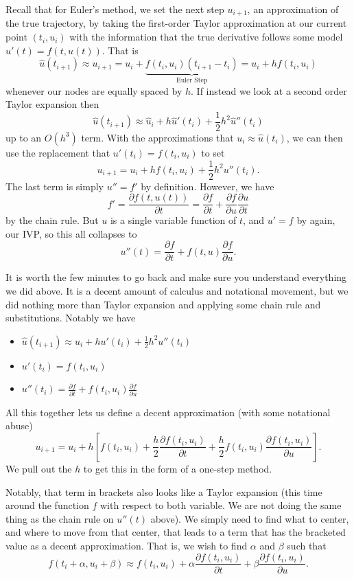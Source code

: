 \documentclass[11pt]{article}
\begin{document}
Recall that for Euler's method, we set the next step $u_{i+1}$, an approximation of the true trajectory, by taking the first-order Taylor approximation at our current point $(t_i, u_i)$ with the information that the true derivative follows some model $u'(t) = f(t, u(t))$. That is $$\hat{u}(t_{i+1}) \approx u_{i+1} = u_i + \underbrace{f(t_i, u_i)(t_{i+1}-t_i)}_{\text{Euler Step}} = u_i + hf(t_i, u_i)$$ whenever our nodes are equally spaced by $h$. If instead we look at a second order Taylor expansion then $$\hat{u}(t_{i+1}) \approx \hat{u}_i + h\hat{u}'(t_i) + \frac{1}{2}h^2 \hat{u}''(t_i)$$ up to an $O(h^3)$ term. With the approximations that $u_i \approx \hat{u}(t_i)$, we can then use the replacement that $u'(t_i)=f(t_i, u_i)$ to set $$u_{i+1} = u_i + hf(t_i, u_i) + \frac{1}{2}h^2 u''(t_i).$$
The last term is simply $u'' = f'$ by definition. However, we have $$f' = \frac{\partial f(t, u(t))}{\partial t} = \frac{\partial f}{\partial t}  + \frac{\partial f}{\partial u} \frac{\partial u}{\partial t} $$
by the chain rule. But $u$ is a single variable function of $t$, and $u' = f$ by again, our IVP, so this all collapses to $$u''(t) = \frac{\partial f}{\partial t}  + f(t,u)\frac{\partial f}{\partial u} .$$
\begin{remark}
    It is worth the few minutes to go back and make sure you understand everything we did above. It is a decent amount of calculus and notational movement, but we did nothing more than Taylor expansion and applying some chain rule and substitutions. Notably we have \begin{itemize}
        \item $\hat{u}(t_{i+1}) \approx u_i + hu'(t_i) + \frac{1}{2}h^2 u''(t_i)$
        \item  $u'(t_i) = f(t_i, u_i)$
        \item  $u''(t_i) = \frac{\partial f}{\partial t} + f(t_i, u_i)\frac{\partial f}{\partial u} $
    \end{itemize}
    All this together lets us define a decent approximation (with some notational abuse) $$u_{i+1} = u_i + h\left[f(t_i, u_i) + \frac{h}{2}\frac{\partial f(t_i, u_i)}{\partial t}+\frac{h}{2}f(t_i, u_i)\frac{\partial f(t_i, u_i)}{\partial u}\right].$$
    We pull out the $h$ to get this in the form of a one-step method.
\end{remark}
Notably, that term in brackets also looks like a Taylor expansion (this time around the function $f$ with respect to both variable. We are not doing the same thing as the chain rule on $u''(t)$ above). We simply need to find what to center, and where to move from that center, that leads to a term that has the bracketed value as a decent approximation. That is, we wish to find $\alpha$ and $\beta$ such that $$f(t_i+\alpha, u_i +\beta) \approx f(t_i, u_i) + \alpha \frac{\partial f(t_i, u_i)}{\partial t}+\beta \frac{\partial f(t_i, u_i)}{\partial u}.  $$
\end{document}
